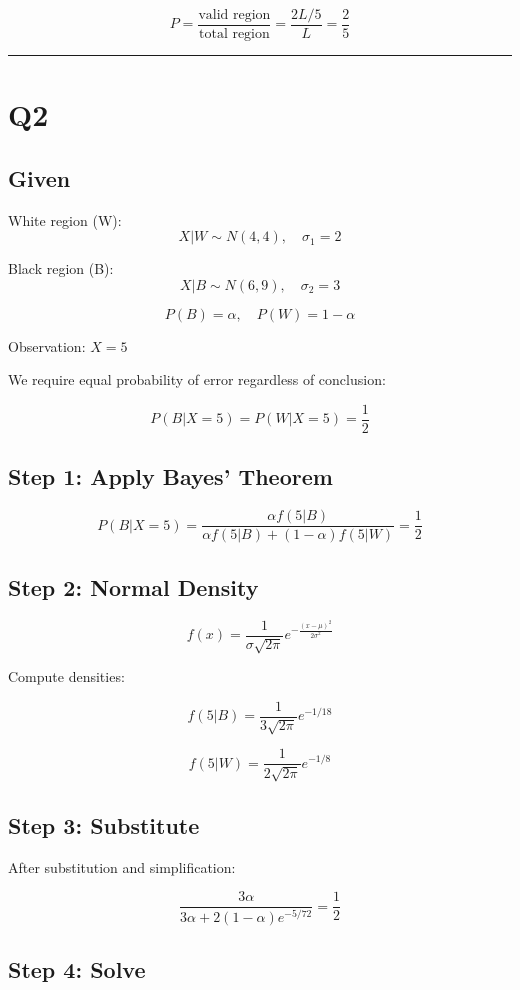 \documentclass[12pt]{article}
\begin{document}
\[
P = \frac{\text{valid region}}{\text{total region}}
= \frac{2L/5}{L}
= \frac{2}{5}
\]

\hrule
\vspace{0.5cm}

\section*{Q2}

\subsection*{Given}

White region (W):
\[
X|W \sim N(4,4), \quad \sigma_1 = 2
\]

Black region (B):
\[
X|B \sim N(6,9), \quad \sigma_2 = 3
\]

\[
P(B) = \alpha, \quad P(W) = 1-\alpha
\]

Observation: $X = 5$

We require equal probability of error regardless of conclusion:

\[
P(B|X=5) = P(W|X=5) = \frac{1}{2}
\]

\subsection*{Step 1: Apply Bayes’ Theorem}

\[
P(B|X=5)
=
\frac{\alpha f(5|B)}
{\alpha f(5|B) + (1-\alpha) f(5|W)}
= \frac{1}{2}
\]

\subsection*{Step 2: Normal Density}

\[
f(x) = \frac{1}{\sigma\sqrt{2\pi}}
e^{-\frac{(x-\mu)^2}{2\sigma^2}}
\]

Compute densities:

\[
f(5|B) = \frac{1}{3\sqrt{2\pi}} e^{-1/18}
\]

\[
f(5|W) = \frac{1}{2\sqrt{2\pi}} e^{-1/8}
\]

\subsection*{Step 3: Substitute}

After substitution and simplification:

\[
\frac{3\alpha}{3\alpha + 2(1-\alpha)e^{-5/72}}
= \frac{1}{2}
\]

\subsection*{Step 4: Solve}
\end{document}
